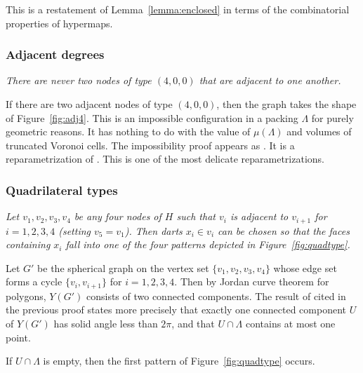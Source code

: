 \documentclass{article} %
\begin{document}
This is a restatement of Lemma~\ref{lemma:enclosed} in terms of the
combinatorial properties of hypermaps.


\subsubsection{Adjacent degrees}

{\it There are never two nodes of type $(4,0,0)$ that are adjacent to one another.}

If there are two adjacent nodes of type $(4,0,0)$, then the graph takes the
shape of Figure~\ref{fig:adj4}.  This is an impossible configuration in a packing $\Lambda$
for purely geometric reasons.  It has nothing to do with the value of $\mu(\Lambda)$
and volumes of truncated Voronoi cells.
The impossibility proof appears as \cite[Lemma~3.8]{Hales:2002:Dodec}. It is a reparametrization
of \cite[Prop.4.2]{Hales:1997:DCG}.  This is one of the most delicate reparametrizations.

\begin{floatingfigure}{30mm}
  \begin{center}
   \end{center}
  \caption{}
\label{fig:adj4}
\end{floatingfigure}

\subsubsection{Quadrilateral types}


{\it Let $v_1,v_2,v_3,v_4$ be any four nodes of $H$ such that $v_i$ is adjacent
to $v_{i+1}$ for $i=1,2,3,4$ (setting $v_5=v_1$).  Then darts $x_i\in v_i$ can be chosen
so that the faces containing $x_i$ fall into one of the four patterns depicted
in Figure~\ref{fig:quadtype}.}

Let $G'$ be the spherical graph on the vertex set $\{v_1,v_2,v_3,v_4\}$
whose edge set forms a cycle $\{v_i,v_{i+1}\}$ for $i=1,2,3,4$.  Then by
Jordan curve theorem for polygons, $Y(G')$ consists of two connected components.
The result of \cite[Lemma~3.8]{Hales:2002:Dodec} cited in the previous proof states more precisely
that exactly one connected component $U$ of $Y(G')$ has solid angle less than $2\pi$,
and that $U\cap\Lambda$ contains at most one point.

If $U\cap\Lambda$ is empty, then the first pattern of Figure~\ref{fig:quadtype} occurs.
\end{document}
